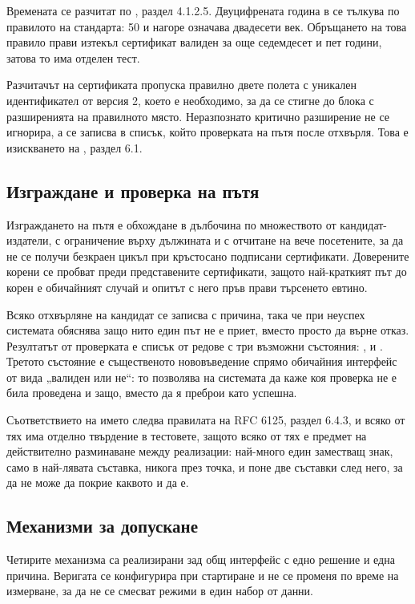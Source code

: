 Времената се разчитат по \cite{rfc5280}, раздел 4.1.2.5. Двуцифрената година в
 се тълкува по правилото на стандарта: 50 и нагоре означава двадесети век.
Обръщането на това правило прави изтекъл сертификат валиден за още седемдесет и пет години,
затова то има отделен тест.

Разчитачът на сертификата пропуска правилно двете полета с уникален идентификател от версия
2, което е необходимо, за да се стигне до блока с разширенията на правилното място.
Неразпознато критично разширение не се игнорира, а се записва в списък, който проверката на
пътя после отхвърля. Това е изискването на \cite{rfc5280}, раздел 6.1.

\subsection{Изграждане и проверка на пътя}
\label{subsec:impl_validator}

Изграждането на пътя е обхождане в дълбочина по множеството от кандидат-издатели, с
ограничение върху дължината и с отчитане на вече посетените, за да не се получи безкраен
цикъл при кръстосано подписани сертификати. Доверените корени се пробват преди
представените сертификати, защото най-краткият път до корен е обичайният случай и опитът с
него пръв прави търсенето евтино.

Всяко отхвърляне на кандидат се записва с причина, така че при неуспех системата обяснява
защо нито един път не е приет, вместо просто да върне отказ. Резултатът от проверката е
списък от редове с три възможни състояния: ,  и . Третото
състояние е същественото нововъведение спрямо обичайния интерфейс от вида „валиден или не“:
то позволява на системата да каже коя проверка не е била проведена и защо, вместо да я
преброи като успешна.

Съответствието на името следва правилата на RFC 6125, раздел 6.4.3, и всяко от тях има
отделно твърдение в тестовете, защото всяко от тях е предмет на действително разминаване
между реализации: най-много един заместващ знак, само в най-лявата съставка, никога през
точка, и поне две съставки след него, за да не може  да покрие каквото и да е.

\subsection{Механизми за допускане}
\label{subsec:impl_admission}

Четирите механизма са реализирани зад общ интерфейс с едно решение и една причина.
Веригата се конфигурира при стартиране и не се променя по време на измерване, за да не се
смесват режими в един набор от данни.

